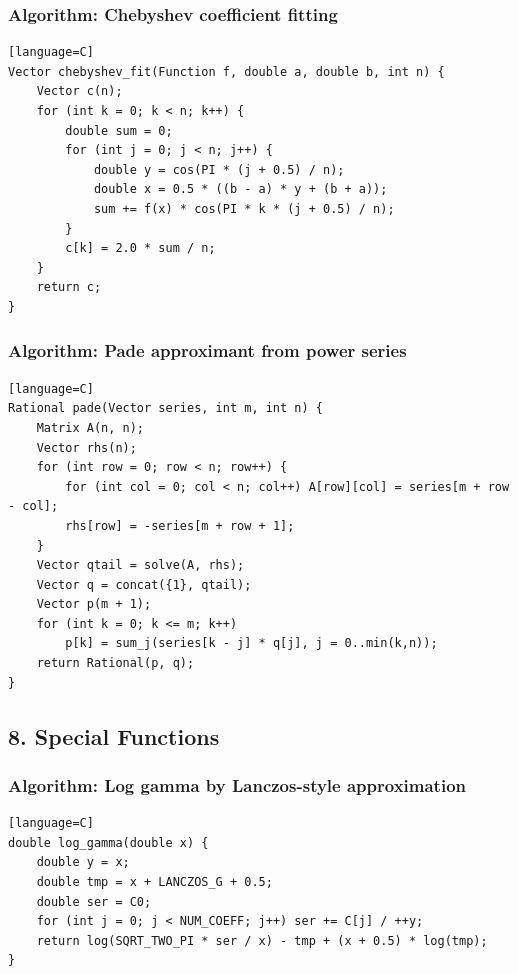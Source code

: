 \documentclass[11pt]{article}
\begin{document}
\subsubsection{Algorithm: Chebyshev coefficient fitting}\label{algorithm-chebyshev-coefficient-fitting}

\begin{verbatim}[language=C]
Vector chebyshev_fit(Function f, double a, double b, int n) {
    Vector c(n);
    for (int k = 0; k < n; k++) {
        double sum = 0;
        for (int j = 0; j < n; j++) {
            double y = cos(PI * (j + 0.5) / n);
            double x = 0.5 * ((b - a) * y + (b + a));
            sum += f(x) * cos(PI * k * (j + 0.5) / n);
        }
        c[k] = 2.0 * sum / n;
    }
    return c;
}
\end{verbatim}

\subsubsection{Algorithm: Pade approximant from power series}\label{algorithm-pade-approximant-from-power-series}

\begin{verbatim}[language=C]
Rational pade(Vector series, int m, int n) {
    Matrix A(n, n);
    Vector rhs(n);
    for (int row = 0; row < n; row++) {
        for (int col = 0; col < n; col++) A[row][col] = series[m + row - col];
        rhs[row] = -series[m + row + 1];
    }
    Vector qtail = solve(A, rhs);
    Vector q = concat({1}, qtail);
    Vector p(m + 1);
    for (int k = 0; k <= m; k++)
        p[k] = sum_j(series[k - j] * q[j], j = 0..min(k,n));
    return Rational(p, q);
}
\end{verbatim}

\subsection{8. Special Functions}\label{special-functions}

\subsubsection{Algorithm: Log gamma by Lanczos-style approximation}\label{algorithm-log-gamma-by-lanczos-style-approximation}

\begin{verbatim}[language=C]
double log_gamma(double x) {
    double y = x;
    double tmp = x + LANCZOS_G + 0.5;
    double ser = C0;
    for (int j = 0; j < NUM_COEFF; j++) ser += C[j] / ++y;
    return log(SQRT_TWO_PI * ser / x) - tmp + (x + 0.5) * log(tmp);
}
\end{verbatim}
\end{document}
